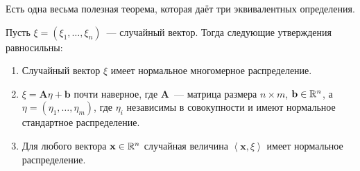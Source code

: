 Есть одна весьма полезная теорема, которая даёт три эквивалентных определения.
\begin{theorem}
	Пусть \(\xi = (\xi_{1}, \dots, \xi_{n})\)~--- случайный вектор. Тогда 
	следующие утверждения равносильны:
	\begin{enumerate}
		\item Случайный вектор \(\xi\) имеет нормальное многомерное 
		распределение.
		\item \(\xi = \mathbf{A}\eta + \mathbf{b}\) почти наверное, где 
		\(\mathbf{A}\)~--- матрица размера \(n \times m\), \(\mathbf{b} \in 
		\mathbb{R}^n\), а \(\eta = (\eta_{1}, \dots, \eta_{m})\), где \(\eta_{i}\) 
		независимы в совокупности и имеют нормальное стандартное распределение.
		\item Для любого вектора \(\mathbf{x} \in \mathbb{R}^n\) случайная величина 
		\(\left\langle\mathbf{x}, \xi\right\rangle\) имеет нормальное 
		распределение.
	\end{enumerate}
\end{theorem}

